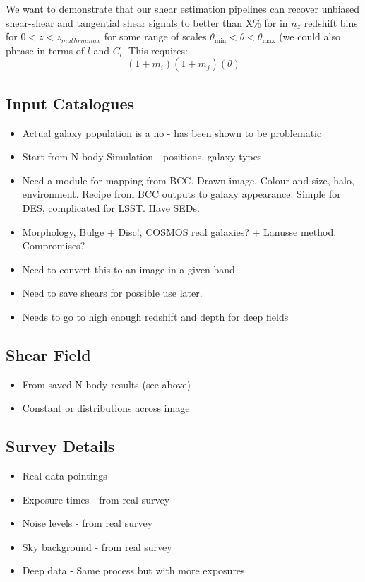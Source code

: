 \documentclass[\docopts]{\docclass}
\begin{document}
We want to demonstrate that our shear estimation pipelines can recover unbiased shear-shear and tangential shear signals to better than X\% for in $n_z$ redshift bins for $0<z<z_{
mathrm{max}}$ for some range of scales $\theta_{\mathrm{min}} < \theta < \theta_{\mathrm{max}}$ (we could also phrase in terms of $l$ and $C_l$. This requires:
\begin{equation}
(1+m_i)(1+m_j)(\theta) 
\end{equation}


\subsection{Input Catalogues}

\begin{itemize}
\item Actual galaxy population is a no - has been shown to be problematic
\item Start from N-body Simulation - positions, galaxy types
\item Need a module for mapping from BCC.  Drawn image.  Colour and size, halo, environment.
	Recipe from BCC outputs to galaxy appearance.
	Simple for DES, complicated for LSST.
	Have SEDs.
\item Morphology, Bulge + Disc!, COSMOS real galaxies? + Lanusse method. Compromises?
\item Need to convert this to an image in a given band
\item Need to save shears for possible use later.
\item Needs to go to high enough redshift and depth for deep fields
\end{itemize}

\subsection{Shear Field}

\begin{itemize}
\item From saved N-body results (see above)
\item Constant or distributions across image
\end{itemize}

\subsection{Survey Details}

\begin{itemize}
\item Real data pointings
\item Exposure times - from real survey
\item Noise levels - from real survey
\item Sky background - from real survey
\item Deep data - Same process but with more exposures
\end{itemize}
\end{document}
